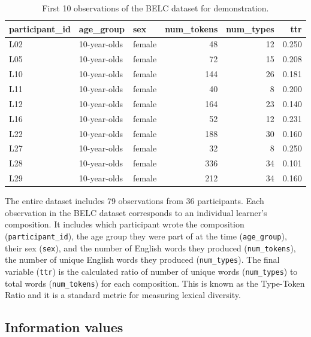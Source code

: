 \documentclass[
  letterpaper,
]{scrbook}
\begin{document}
\hypertarget{tbl-belc-overview}{}
\begin{table}
\caption{\label{tbl-belc-overview}First 10 observations of the BELC dataset for demonstration. }\tabularnewline

\centering
\begin{tabular}{l|l|l|r|r|r}
\hline
participant\_id & age\_group & sex & num\_tokens & num\_types & ttr\\
\hline
L02 & 10-year-olds & female & 48 & 12 & 0.250\\
\hline
L05 & 10-year-olds & female & 72 & 15 & 0.208\\
\hline
L10 & 10-year-olds & female & 144 & 26 & 0.181\\
\hline
L11 & 10-year-olds & female & 40 & 8 & 0.200\\
\hline
L12 & 10-year-olds & female & 164 & 23 & 0.140\\
\hline
L16 & 10-year-olds & female & 52 & 12 & 0.231\\
\hline
L22 & 10-year-olds & female & 188 & 30 & 0.160\\
\hline
L27 & 10-year-olds & female & 32 & 8 & 0.250\\
\hline
L28 & 10-year-olds & female & 336 & 34 & 0.101\\
\hline
L29 & 10-year-olds & female & 212 & 34 & 0.160\\
\hline
\end{tabular}
\end{table}

The entire dataset includes 79 observations from 36 participants. Each
observation in the BELC dataset corresponds to an individual learner's
composition. It includes which participant wrote the composition
(\texttt{participant\_id}), the age group they were part of at the time
(\texttt{age\_group}), their sex (\texttt{sex}), and the number of
English words they produced (\texttt{num\_tokens}), the number of unique
English words they produced (\texttt{num\_types}). The final variable
(\texttt{ttr}) is the calculated ratio of number of unique words
(\texttt{num\_types}) to total words (\texttt{num\_tokens}) for each
composition. This is known as the Type-Token Ratio and it is a standard
metric for measuring lexical diversity.

\hypertarget{information-values}{%
\subsection{Information values}\label{information-values}}
\end{document}
